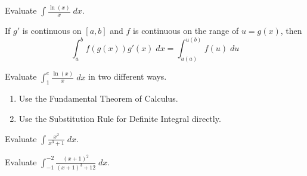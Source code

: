 \documentclass[../main.tex]{subfiles}
\begin{document}
\begin{example}
  Evaluate \(\int \frac{\ln(x)}{x} \;dx\).

\end{example}

\clearpage
\begin{mdframed}[style=withref]
  If \(g'\) is continuous on \([a,b]\) and \(f\) is continuous on the range of \(u = g(x)\), then
  \[
    {\int_{a}^{b} f(g(x)) g'(x) \;dx = \int_{u(a)}^{u(b)} f(u) \;du}
  \]
\end{mdframed}
\vspace{1in}

\begin{example}
  Evaluate \(\int_{1}^{e} \frac{\ln(x)}{x} \;dx\) in two different ways.

  \begin{enumerate}
  \item Use the Fundamental Theorem of Calculus.
    \vspace{2in}

  \item Use the Substitution Rule for Definite Integral directly.

  \end{enumerate}
\end{example}

\clearpage
\begin{example}
  Evaluate \(\int \frac{x^{2}}{x^{3} + 1} \;dx\).
\end{example}
\clearpage

\begin{example}
  Evaluate \(\int_{-1}^{-2} \frac{(x+1)^{2}}{(x+1)^{3} + 12} \;dx\).
\end{example}
\clearpage
\end{document}
